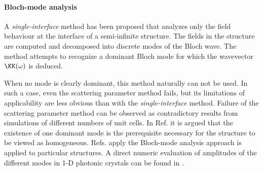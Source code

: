 



\paragraph{Bloch-mode analysis} 
A \textit{single-interface} method has been proposed \cite{yang2010retrieving} %
that analyzes only the field behaviour at the interface of a semi-infinite structure.  
The fields in the structure are computed and decomposed into discrete modes of the Bloch wave. The method attempts to recognize a dominant Bloch mode for which the wavevector $\KK(\omega)$ is deduced.
\cite{zhang2006optical} %
\cite{rockstuhl2008light} %

When no mode is clearly dominant, this method naturally can not be used. In such a case, even the scattering parameter method fails, but its limitations of applicability are less obvious than with the \textit{single-interface} method. Failure of the scattering parameter method can be observed as contradictory results \cite{rockstuhl2008transition} from simulations of different numbers of unit cells.
In Ref. \cite{paul2011reflection} %
it is argued that the existence of one dominant mode is the prerequisite necessary for the structure to be viewed as homogeneous. Refs. \cite{paul2011reflection,andryieuski2012bloch} apply the Bloch-mode analysis approach is applied to particular structures. A direct numeric evaluation of amplitudes of the different modes in 1-D photonic crystals can be found in 
\cite{mortensen2010unambiguous}. %

